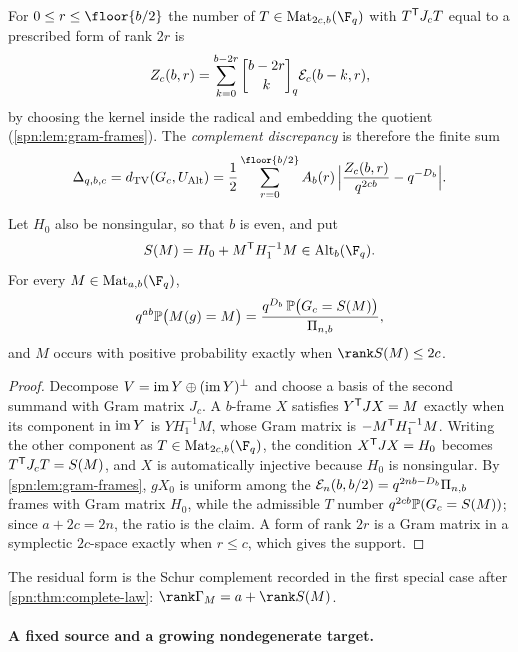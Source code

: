 For $0\le r\le\floor{b/2}$ the number of $T\in\spnMat_{2c,b}(\F_q)$ with $T^{\mathsf{T}}J_cT$ equal to
a prescribed form of rank $2r$ is
\[
 Z_c(b,r)=\sum_{k=0}^{b-2r}\spnqbin{b-2r}{k}{q}\spnEmb_c(b-k,r),
\]
by choosing the kernel inside the radical and embedding the quotient
(\cref{spn:lem:gram-frames}). The \emph{complement discrepancy} is therefore the finite sum
\begin{equation}\label{spn:eq:complement-discrepancy}
 \Delta_{q,b,c}=\spnTV(G_c,U_{\spnAlt})
 =\frac12\sum_{r=0}^{\floor{b/2}}A_b(r)\,
 \Bigl|\frac{Z_c(b,r)}{q^{2cb}}-q^{-D_b}\Bigr| .
\end{equation}

\begin{proposition}\label{spn:prop:residual}
Let $H_0$ also be nonsingular, so that $b$ is even, and put
\begin{equation}\label{spn:eq:residual-form}
 S(M)=H_0+M^{\spnT}H_1^{-1}M\in\spnAlt_b(\F_q).
\end{equation}
For every $M\in\spnMat_{a,b}(\F_q)$,
\[
 q^{ab}\mathbb{P}\bigl(M(g)=M\bigr)=\frac{q^{D_b}\,\mathbb{P}\bigl(G_c=S(M)\bigr)}{\Pi_{n,b}} ,
\]
and $M$ occurs with positive probability exactly when $\rank S(M)\le2c$.
\end{proposition}

\begin{proof}
Decompose $V=\operatorname{im} Y\oplus(\operatorname{im} Y)^\perp$ and choose a basis of the second summand with Gram
matrix $J_c$. A $b$-frame $X$ satisfies $Y^{\mathsf{T}}JX=M$ exactly when its component in
$\operatorname{im} Y$ is $YH_1^{-1}M$, whose Gram matrix is $-M^{\mathsf{T}}H_1^{-1}M$. Writing the other
component as $T\in\spnMat_{2c,b}(\F_q)$, the condition $X^{\mathsf{T}}JX=H_0$ becomes
$T^{\mathsf{T}}J_cT=S(M)$, and $X$ is automatically injective because $H_0$ is nonsingular. By
\cref{spn:lem:gram-frames}, $gX_0$ is uniform among the
$\mathcal{E}_n(b,b/2)=q^{2nb-D_b}\Pi_{n,b}$ frames with Gram matrix $H_0$, while the admissible
$T$ number $q^{2cb}\mathbb{P}(G_c=S(M))$; since $a+2c=2n$, the ratio is the claim. A form of rank
$2r$ is a Gram matrix in a symplectic $2c$-space exactly when $r\le c$, which gives the support.
\end{proof}

The residual form is the Schur complement recorded in the first special case after
\cref{spn:thm:complete-law}: $\rank\Gamma_M=a+\rank S(M)$.

\paragraph{A fixed source and a growing nondegenerate target.}

